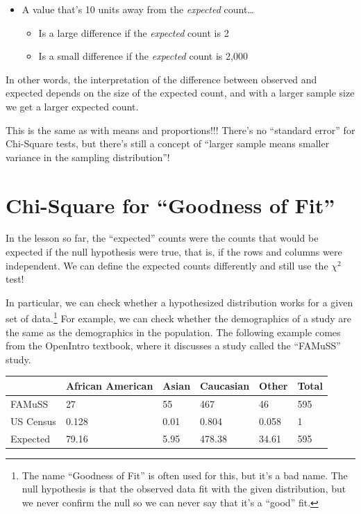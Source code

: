 \documentclass[
  letterpaper,
  DIV=11,
  numbers=noendperiod,
  oneside]{scrreprt}
\providecommand{\tightlist}{%
  \setlength{\itemsep}{0pt}\setlength{\parskip}{0pt}}\usepackage{longtable,booktabs,array}
\begin{document}
\begin{itemize}
\tightlist
\item
  A value that's 10 units away from the \emph{expected} count\ldots{}

  \begin{itemize}
  \tightlist
  \item
    Is a large difference if the \emph{expected} count is 2
  \item
    Is a small difference if the \emph{expected} count is 2,000\lspace
  \end{itemize}
\end{itemize}

In other words, the interpretation of the difference between observed
and expected depends on the size of the expected count, and with a
larger sample size we get a larger expected count.

\pspace

This is the same as with means and proportions!!! There's no ``standard
error'' for Chi-Square tests, but there's still a concept of ``larger
sample means smaller variance in the sampling distribution''!

\hypertarget{chi-square-for-goodness-of-fit}{%
\section{Chi-Square for ``Goodness of
Fit''}\label{chi-square-for-goodness-of-fit}}

In the lesson so far, the ``expected'' counts were the counts that would
be expected if the null hypothesis were true, that is, if the rows and
columns were independent. We can define the expected counts differently
and still use the \(\chi^2\) test!

In particular, we can check whether a hypothesized distribution works
for a given set of data.\footnote{The name ``Goodness of Fit'' is often
  used for this, but it's a bad name. The null hypothesis is that the
  observed data fit with the given distribution, but we never confirm
  the null so we can never say that it's a ``good'' fit.} For example,
we can check whether the demographics of a study are the same as the
demographics in the population. The following example comes from the
OpenIntro textbook, where it discusses a study called the ``FAMuSS''
study.

\begin{longtable}[]{@{}llllll@{}}
\toprule\noalign{}
& African American & Asian & Caucasian & Other & Total \\
\midrule\noalign{}
\endhead
\bottomrule\noalign{}
\endlastfoot
FAMuSS & 27 & 55 & 467 & 46 & 595 \\
US Census & 0.128 & 0.01 & 0.804 & 0.058 & 1 \\
Expected & 79.16 & 5.95 & 478.38 & 34.61 & 595 \\
\end{longtable}
\end{document}
